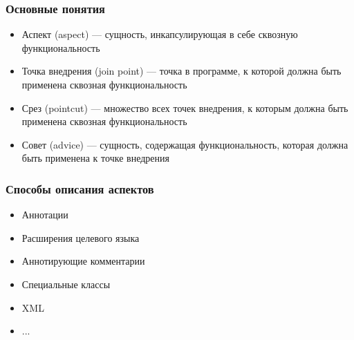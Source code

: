 \documentclass[hyperref={pdftex,unicode}]{beamer}
\begin{document}
\begin{frame}[fragile=singleslide]
	\frametitle{Основные понятия}
	\begin{itemize}
		\item Аспект (aspect) --- сущность, инкапсулирующая в себе сквозную
		      функциональность
		\item Точка внедрения (join point) --- точка в программе, к которой
		      должна быть применена сквозная функциональность
		\item Срез (pointcut) --- множество всех точек внедрения, к которым
		      должна быть применена сквозная функциональность
		\item Совет (advice) --- сущность, содержащая функциональность,
		      которая должна быть применена к точке внедрения
		      
	\end{itemize}
\end{frame}	
	

\begin{frame}[fragile=singleslide]
	\frametitle{Способы описания аспектов}
	\begin{itemize}
		\item Аннотации
		\item Расширения целевого языка
		\item Аннотирующие комментарии
		\item Специальные классы
		\item XML
		\item ...
	\end{itemize}
\end{frame}
\end{document}

